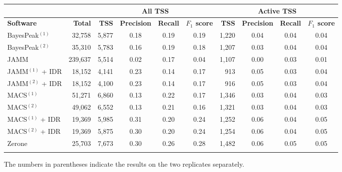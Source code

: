 \documentclass{bioinfo}
\begin{document}
\begin{table}[!tbp]
{\begin{tabular}{lr|rccc|rccc}
        \multicolumn{2}{c}{} & \multicolumn{4}{c}{\textbf{All TSS}} & \multicolumn{4}{c}{\textbf{Active TSS}} \\
        \midrule
        \textbf{Software} & \textbf{Total} &
        \textbf{TSS} & \textbf{Precision} & \textbf{Recall} & \textbf{$F_{1}$ score} &
        \textbf{TSS} & \textbf{Precision} & \textbf{Recall} & \textbf{$F_{1}$ score} \\
        \midrule
        BayesPeak$^{(1)}$  &  32,758 & 5,877 & 0.18 & 0.19 & 0.19 & 1,220 & 0.04 & 0.04 & 0.04 \\
        BayesPeak$^{(2)}$  &  35,310 & 5,783 & 0.16 & 0.19 & 0.18 & 1,207 & 0.03 & 0.04 & 0.04 \\
        JAMM               & 239,637 & 5,514 & 0.02 & 0.17 & 0.04 & 1,107 & 0.00 & 0.03 & 0.01 \\
        JAMM$^{(1)}$ + IDR &  18,152 & 4,141 & 0.23 & 0.14 & 0.17 &   913 & 0.05 & 0.03 & 0.04 \\
        JAMM$^{(2)}$ + IDR &  18,152 & 4,100 & 0.23 & 0.14 & 0.17 &   916 & 0.05 & 0.03 & 0.04 \\
        MACS$^{(1)}$       &  51,271 & 6,860 & 0.13 & 0.22 & 0.17 & 1,346 & 0.03 & 0.04 & 0.03 \\
        MACS$^{(2)}$       &  49,062 & 6,552 & 0.13 & 0.21 & 0.16 & 1,321 & 0.03 & 0.04 & 0.03 \\
        MACS$^{(1)}$ + IDR &  19,369 & 5,985 & 0.31 & 0.20 & 0.24 & 1,252 & 0.06 & 0.04 & 0.05 \\
        MACS$^{(2)}$ + IDR &  19,369 & 5,875 & 0.30 & 0.20 & 0.24 & 1,254 & 0.06 & 0.04 & 0.05 \\
        Zerone             &  25,703 & 7,673 & 0.30 & 0.26 & 0.28 & 1,482 & 0.06 & 0.05 & 0.05 \\
        \botrule
\end{tabular}}{The numbers in parentheses indicate the results on the two
replicates separately.}
\end{table}
\end{document}

